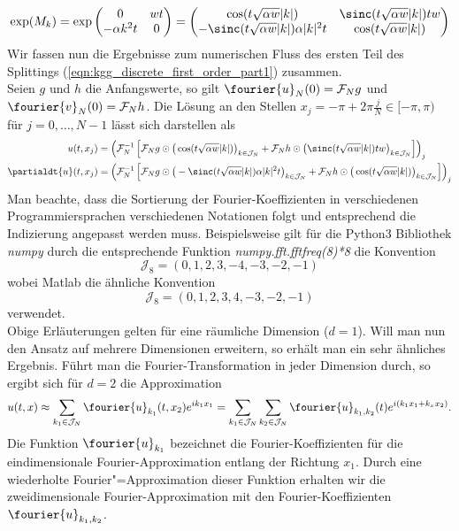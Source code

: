 \[\exp(M_k)=\exp\begin{pmatrix}0 & wt\\ -\alpha k^2t & 0\end{pmatrix}=
\begin{pmatrix}\cos(t\sqrt{\alpha w}|k|) & \sinc(t\sqrt{\alpha w}|k|)tw\\-\sinc(t\sqrt{\alpha w}|k|)\alpha |k|^2t & \cos(t\sqrt{\alpha w}|k|)\end{pmatrix}\]
Wir fassen nun die Ergebnisse zum numerischen Fluss des ersten Teil des Splittings (\ref{eqn:kgg_discrete_first_order_part1}) zusammen.\\
Seien $g$ und $h$ die Anfangswerte, so gilt $\fourier{u}_N(0)=\mathcal{F}_Ng$ und $\fourier{v}_N(0)=\mathcal{F}_Nh$. Die Lösung an den Stellen $x_j=-\pi+2\pi\frac{j}{N}\in [-\pi,\pi)$ für $j=0,\dots,N-1$ lässt sich darstellen als
\begin{align*}
u(t,x_j)&=\left(\mathcal{F}_N^{-1}\left[\mathcal{F}_Ng\odot \big(\cos(t\sqrt{\alpha w}|k|)\big)_{k\in\mathcal{J}_N} + \mathcal{F}_Nh\odot \big(\sinc(t\sqrt{\alpha w}|k|)tw\big)_{k\in\mathcal{J}_N}\right]\right)_j\\
\partialdt{u}(t,x_j)&=\left(\mathcal{F}_N^{-1}\left[\mathcal{F}_Ng \odot \big(-\sinc(t\sqrt{\alpha w}|k|)\alpha|k|^2t\big)_{k\in\mathcal{J}_N}+\mathcal{F}_Nh\odot \big(\cos(t\sqrt{\alpha w}|k|)\big)_{k\in\mathcal{J}_N}\right]\right)_j
\end{align*}
Man beachte, dass die Sortierung der Fourier-Koeffizienten in verschiedenen Programmiersprachen verschiedenen Notationen folgt und entsprechend die Indizierung angepasst werden muss. Beispielsweise gilt für die Python3 Bibliothek \emph{numpy} durch die entsprechende Funktion \emph{numpy.fft.fftfreq(8)*8} die Konvention
\[\mathcal{J}_8=\left( 0,  1,  2,  3, -4, -3, -2, -1\right)\]
wobei Matlab die ähnliche Konvention
\[\mathcal{J}_8=\left( 0,  1,  2,  3, 4, -3, -2, -1\right)\]
verwendet.\\[0.3cm]
Obige Erläuterungen gelten für eine räumliche Dimension ($d=1$). Will man nun den Ansatz auf mehrere Dimensionen erweitern, so erhält man ein sehr ähnliches Ergebnis.
Führt man die Fourier-Transformation in jeder Dimension durch, so ergibt sich für $d=2$ die Approximation
\[u(t,x)\approx\sum_{k_1\in\mathcal{J}_N}\fourier{u}_{k_1}(t,x_2)e^{ik_1x_1}=\sum_{k_1\in\mathcal{J}_N}\sum_{k_2\in\mathcal{J}_N}\fourier{u}_{k_1,k_2}(t)e^{i(k_1x_1+k_xx_2)}.\]
Die Funktion $\fourier{u}_{k_1}$ bezeichnet die Fourier-Koeffizienten für die eindimensionale Fourier-Approximation entlang der Richtung $x_1$. Durch eine wiederholte Fourier"=Approximation dieser Funktion erhalten wir die zweidimensionale Fourier-Approximation mit den Fourier-Koeffizienten $\fourier{u}_{k_1,k_2}$.\\
